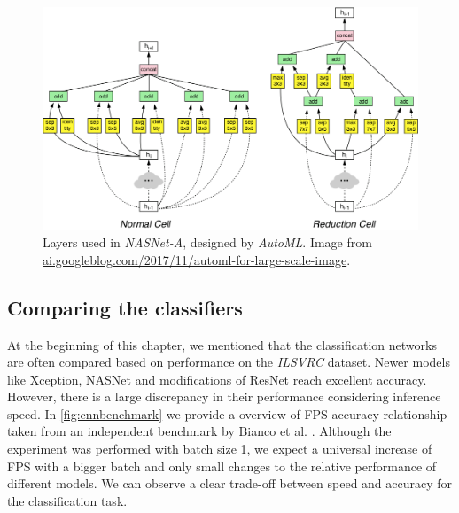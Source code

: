 \begin{figure}
    \includegraphics[width=\textwidth]{img/nasnet}
    \caption{Layers used in \textit{NASNet-A}, designed by \textit{AutoML}. Image from \url{ai.googleblog.com/2017/11/automl-for-large-scale-image}.}
    \label{fig:nasnet}
\end{figure}

\subsection{Comparing the classifiers}
At the beginning of this chapter, we mentioned that the classification networks are often compared based on performance on the \textit{ILSVRC} dataset. Newer models like Xception, NASNet and modifications of ResNet reach excellent accuracy. However, there is a large discrepancy in their performance considering inference speed. In \cref{fig:cnnbenchmark} we provide a overview of FPS-accuracy relationship taken from an independent benchmark by Bianco et al. \cite{bib:cnnbenchmark}. Although the experiment was performed with batch size 1, we expect a universal increase of FPS with a bigger batch and only small changes to the relative performance of different models. We can observe a clear trade-off between speed and accuracy for the classification task.

